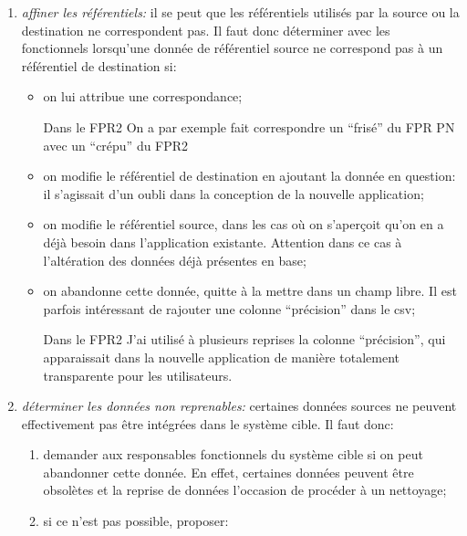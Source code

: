 \documentclass{book}
\begin{document}
\begin{enumerate}
\begin{bclogo}[arrondi = 0.1, couleur = blue!10, logo = \bcinfo]{Dans le FPR2}
\begin{itemize}
  \item précision dans la ville (ex.: ``PARIS'' et ses arrondissements);
 \end{itemize}
 \end{bclogo}
 \item \textit{affiner les référentiels:} il se peut que les référentiels utilisés par la source ou la destination ne correspondent pas. Il faut donc déterminer avec les \gls{fonctionnels} lorsqu'une donnée de référentiel source ne correspond pas à un référentiel de destination si:
 \begin{itemize}
  \item on lui attribue une correspondance;
  \begin{bclogo}[arrondi = 0.1, couleur = blue!10, logo = \bcinfo]{Dans le FPR2}
On a par exemple fait correspondre un ``frisé'' du FPR PN avec un ``crépu'' du FPR2
  \end{bclogo}
  \item on modifie le référentiel de destination en ajoutant la donnée en question: il s'agissait d'un oubli dans la conception de la nouvelle application;
  \item on modifie le référentiel source, dans les cas où on s'aperçoit qu'on en a déjà besoin dans l'application existante. Attention dans ce cas à l'altération des données déjà présentes en base;
  \item on abandonne cette donnée, quitte à la mettre dans un champ libre. Il est parfois intéressant de rajouter une colonne ``précision'' dans le \gls{csv};
  \begin{bclogo}[arrondi = 0.1, couleur = blue!10, logo = \bcinfo]{Dans le FPR2}
J'ai utilisé à plusieurs reprises la colonne ``précision'', qui apparaissait dans la nouvelle application de manière totalement transparente pour les utilisateurs.
  \end{bclogo}
 \end{itemize}
  \item \textit{déterminer les données non reprenables:} certaines données sources ne peuvent effectivement pas être intégrées dans le système cible. Il faut donc:
  \begin{enumerate}
   \item demander aux responsables \gls{fonctionnels} du système cible si on peut abandonner cette donnée. En effet, certaines données peuvent être obsolètes et la reprise de données l'occasion de procéder à un nettoyage;
   \item si ce n'est pas possible, proposer:
   \begin{itemize}

\end{itemize}
\end{enumerate}
\end{enumerate}
\end{document}
